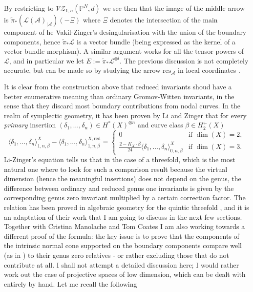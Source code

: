 \documentclass[11pt]{amsart}
\newcommand{\VZ}[3]{\mathcal{V\!Z}_{1,#1}(#2,#3)}
\newcommand{\PP}{\mathbb P}
\theoremstyle{definition}
\theoremstyle{definition}
\begin{document}
By restricting to $\VZ{n}{\PP^N}{d}$ we see then that the image of the middle arrow is $\tilde\pi_*(\mathcal L(\mathcal A)_{|\mathcal A})(-\Xi)$ where $\Xi$ denotes the intersection of the main component of he Vakil-Zinger's desingularisation with the union of the boundary components, hence $\tilde\pi_*\mathcal L$ is a vector bundle (being expressed as the kernel of a vector bundle morphism). A similar argument works for all the tensor powers of $\mathcal L$, and in particular we let $E:=\tilde\pi_*\mathcal L^{\otimes l}$. The previous discussion is not completely accurate, but can be made so by studying the arrow $\mathrm{res}_{\mathcal A}$ in local coordinates \cite[???]{HL}.

It is clear from the construction above that reduced invariants shoud have a better enumerative meaning than ordinary Gromov-Witten invariants, in the sense that they discard most boundary contributions from nodal curves. In the realm of symplectic geometry, it has been proven by Li and Zinger \cite{LZ} that for every \emph{primary} insertion $(\delta_1,\ldots,\delta_n)\in H^*(X)^{\otimes n}$ and curve class $\beta\in H^+_2(X)$
\[
 \langle \delta_1,\ldots,\delta_n \rangle^X_{1,n,\beta}-\langle \delta_1,\ldots,\delta_n \rangle^{X,\mathrm{red}}_{1,n,\beta}=\begin{cases}
 0 & \text{if } \dim(X)=2, \\
 \frac{2-K_X\cdot\beta}{24}\langle \delta_1,\ldots,\delta_n \rangle^X_{0,n,\beta} & \text{if } \dim(X)=3.\end{cases}
\]
Li-Zinger's equation tells us that in the case of a threefold, which is the most natural one where to look for such a comparison result because the virtual dimension (hence the meaningful insertions) does not depend on the genus, the difference between ordinary and reduced genus one invariants is given by the corresponding genus zero invariant multiplied by a certain correction factor. The relation has been proved in algebraic geometry for the quintic threefold \cite{CL}, and it is an adaptation of their work that I am going to discuss in the next few sections. Together with Cristina Manolache and Tom Coates I am also working towards a different proof of the formula: the key issue is to prove that the components of the intrinsic normal cone supported on the boundary components compare well (as in \cite{Manolache-push}) to their genus zero relatives - or rather excluding those that do not contribute at all. I shall not attempt a detailed discussion here; I would rather work out the case of projective spaces of low dimension, which can be dealt with entirely by hand. Let me recall the following
\end{document}
